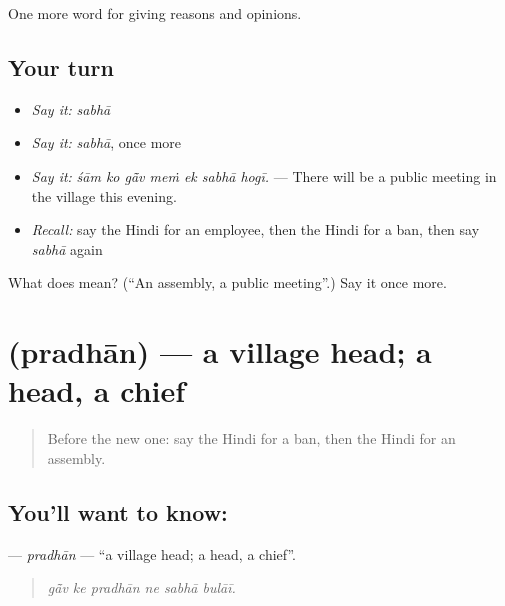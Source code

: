 \begin{grammarlens}[title={What you've built}]
One more word for giving reasons and opinions.
\end{grammarlens}

\subsection*{Your turn}
\begin{itemize}
\raggedright
  \item \emph{Say it:} \emph{sabhā}
  \item \emph{Say it:} \emph{sabhā}, once more
  \item \emph{Say it:} \emph{śām ko gā̃v meṁ ek sabhā hogī.} — There will be a public meeting in the village this evening.
  \item \emph{Recall:} say the Hindi for an employee, then the Hindi for a ban, then say \emph{sabhā} again
\end{itemize}

\begin{tcolorbox}[breakable,colback=teal!4,colframe=teal!35!black,title={Before you move on}]
What does  mean? (\textquotedblleft{}An assembly, a public meeting\textquotedblright{}.) Say it once more.
\end{tcolorbox}
\section[\texorpdfstring{\hi{प्रधान} (pradhān)}{प्रधान (pradhān)}]{ (pradhān) — a village head; a head, a chief}

\label{lesson:HI-C370-pradhan}



\begin{quote}
Before the new one: say the Hindi for a ban, then the Hindi for an assembly.
\end{quote}

\subsection*{You'll want to know: }
\textbf{} — \emph{pradhān} — \textquotedblleft{}a village head; a head, a chief\textquotedblright{}.

\begin{quote}
     
\end{quote}

\begin{quote}
\emph{gā̃v ke pradhān ne sabhā bulāī.}
\end{quote}

